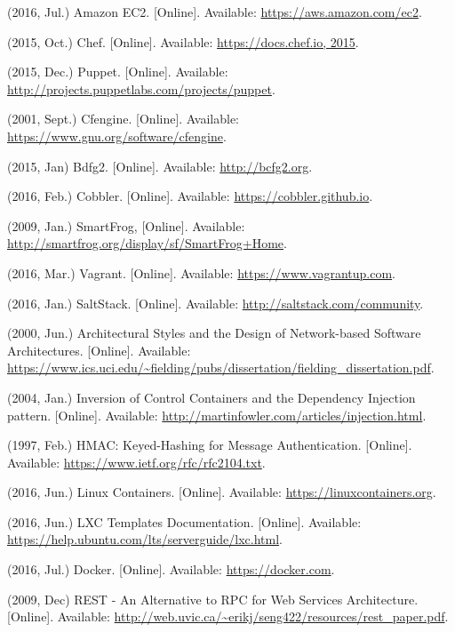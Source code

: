 \documentclass[conference, spanish]{IEEEtran}
\begin{document}
\begin{thebibliography}{1}
 (2016, Jul.) Amazon EC2. [Online]. Available: \url{https://aws.amazon.com/ec2}.

 (2015, Oct.) Chef. [Online]. Available: \url{https://docs.chef.io, 2015}.

 (2015, Dec.) Puppet. [Online]. Available: \url{http://projects.puppetlabs.com/projects/puppet}.

 (2001, Sept.) Cfengine. [Online]. Available: \url{https://www.gnu.org/software/cfengine}.

 (2015, Jan) Bdfg2. [Online]. Available: \url{http://bcfg2.org}.

 (2016, Feb.) Cobbler. [Online]. Available: \url{https://cobbler.github.io}.

 (2009, Jan.) SmartFrog, [Online]. Available: \url{http://smartfrog.org/display/sf/SmartFrog+Home}.

 (2016, Mar.) Vagrant. [Online]. Available: \url{https://www.vagrantup.com}.

 (2016, Jan.) SaltStack. [Online]. Available: \url{http://saltstack.com/community}.

 (2000, Jun.) Architectural Styles and
the Design of Network-based Software Architectures. [Online]. Available: \url{https://www.ics.uci.edu/~fielding/pubs/dissertation/fielding_dissertation.pdf}.

 (2004, Jan.) Inversion of Control Containers and the Dependency Injection pattern. [Online]. Available: \url{http://martinfowler.com/articles/injection.html}.

 (1997, Feb.) HMAC: Keyed-Hashing for Message Authentication. [Online]. Available: \url{https://www.ietf.org/rfc/rfc2104.txt}.

 (2016, Jun.) Linux Containers. [Online]. Available: \url{https://linuxcontainers.org}.

 (2016, Jun.) LXC Templates Documentation. [Online]. Available: \url{https://help.ubuntu.com/lts/serverguide/lxc.html}.

 (2016, Jul.) Docker. [Online]. Available: \url{https://docker.com}.

 (2009, Dec) REST - An Alternative to RPC for Web Services Architecture. [Online]. Available: \url{http://web.uvic.ca/\~erikj/seng422/resources/rest\_paper.pdf}.



\end{thebibliography}




\end{document}
